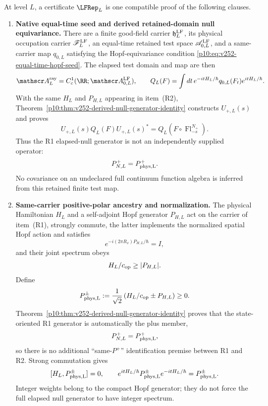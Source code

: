 \documentclass[12pt,a4paper]{article}
\begin{document}
\begin{definition}
\label{p10:def:finite-null-representation-certificate}
At level \(L\), a certificate \(\LFRep_L\) is one compatible proof of the
following clauses.
\begin{enumerate}[label=\textnormal{(R\arabic*)},leftmargin=2.8em]
\item \textbf{Native equal-time seed and derived retained-domain null equivariance.}
There are a finite good-field carrier \(\mathfrak h_L^{\rm LF}\), its physical
occupation carrier \(\mathscr F_L^{\rm LF}\), an equal-time retained test
space \(\mathscr A_{0,L}^{\rm LF}\), and a same-carrier map \(q_{0,L}\)
satisfying the Hopf-equivariance condition
\eqref{p10:eq:v252-equal-time-hopf-seed}.  The elapsed test domain and map are
then
\[
 \mathscr A_L^{\rm ray}=C_c^1(\RR;\mathscr A_{0,L}^{\rm LF}),
 \qquad
 Q_L(F)=\int dt\,e^{-itH_L/\hbar}q_{0,L}(F_t)e^{itH_L/\hbar}.
\]
With the same \(H_L\) and \(P_{H,L}\) appearing in item~\textnormal{(R2)},
Theorem~\ref{p10:thm:v252-derived-null-generator-identity} constructs
\(U_{+,L}(s)\) and proves
\[
 U_{+,L}(s)Q_L(F)U_{+,L}(s)^*
 =Q_L\!\left(F\circ\operatorname{Fl}^{N_+}_{-s}\right).
\]
Thus the R1 elapsed-null generator is not an independently supplied operator:
\[
 P_{N,L}^+=P_{\rm phys,L}^+.
\]
No covariance on an undeclared full continuum function algebra is inferred
from this retained finite test map.

\item \textbf{Same-carrier positive-polar ancestry and normalization.}
The physical Hamiltonian \(H_L\) and a self-adjoint Hopf generator
\(P_{H,L}\) act on the carrier of item~\textnormal{(R1)}, strongly commute,
the latter implements the normalized spatial Hopf action and satisfies
\[
 e^{-i(2\pi R_x)P_{H,L}/\hbar}=I,
\]
and their joint spectrum obeys
\[
 H_L/c_{\rm op}\ge |P_{H,L}|.
\]
Define
\begin{equation}
\label{p10:eq:finite-null-generator-pair}
 P_{\rm phys,L}^{\pm}:=\frac1{\sqrt2}
 \left(H_L/c_{\rm op}\pm P_{H,L}\right)\ge0 .
\end{equation}
Theorem~\ref{p10:thm:v252-derived-null-generator-identity} proves that the
state-oriented R1 generator is automatically the plus member,
\[
 P_{N,L}^+=P_{\rm phys,L}^+,
\]
so there is no additional ``same-\(P^+\)'' identification premise between R1
and R2.  Strong commutation gives
\begin{equation}
\label{p10:eq:v133-total-null-generator-conservation}
 [H_L,P_{\rm phys,L}^{\pm}]=0,
 \qquad
 e^{itH_L/\hbar}P_{\rm phys,L}^{\pm}e^{-itH_L/\hbar}
 =P_{\rm phys,L}^{\pm}.
\end{equation}
Integer weights belong to the compact Hopf generator; they do not force the
full elapsed null generator to have integer spectrum.


\end{enumerate}
\end{definition}
\end{document}
